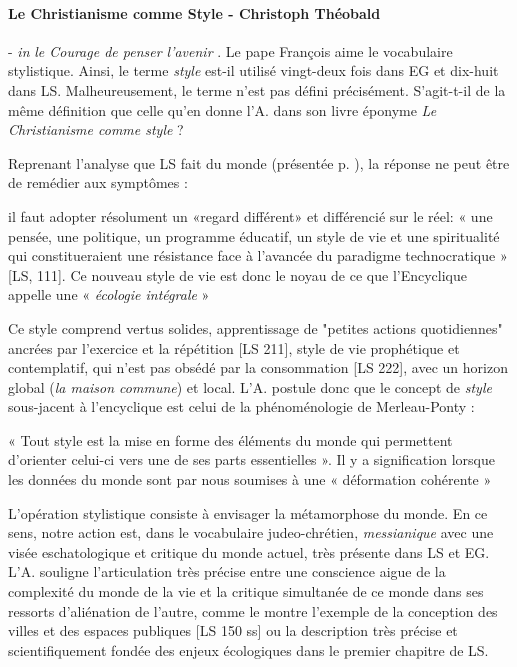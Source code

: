 \paragraph{Le Christianisme comme Style - Christoph Théobald} -  \textit{in }\textit{le Courage de penser l'avenir} \cite[p 169-196]{theobald_courage_2021}. Le pape François aime le vocabulaire stylistique. Ainsi, le terme \textit{style} est-il utilisé vingt-deux fois dans EG et dix-huit dans LS. Malheureusement, le terme n'est pas défini précisément. S'agit-t-il de la même définition que celle qu'en donne l'A. dans son livre éponyme \cite{theobald_christianisme_2007} \textit{Le Christianisme comme style}  ? 
\begin{comment}
    Nous nous proposons de lire ce chapitre soulignant la notion de \textit{recours} des religions et la distinction   entre \textit{ressources et sources} déjà entrevu dans \cite{theobald_lenseignement_2016}. 
    notion de \textit{recours}. Distinction entre \textit{ressources et sources}.  Style prophétique et contemplatif de \textit{Laudato Si’}. Nous n
\end{comment}
Reprenant l'analyse que LS fait du monde (présentée p. \pageref{theo:diagnosticLS}), la réponse ne peut être de remédier aux symptômes :
\begin{singlequote}
     il faut adopter résolument un «regard différent» et différencié sur le réel: « une pensée, une politique, un programme éducatif, un style de vie et une spiritualité qui constitueraient une résistance face à l'avancée du paradigme technocratique » [LS, 111]. Ce nouveau style de vie est donc le noyau de ce que l'Encyclique appelle une « \textit{écologie intégrale} »
\end{singlequote}

Ce style comprend vertus solides, apprentissage de "petites actions quotidiennes" ancrées par l'exercice et la répétition [LS 211], style de vie prophétique et contemplatif, qui n'est pas obsédé par la consommation [LS 222], avec un horizon global (\textit{la maison commune}) et local.
L'A. postule donc que le concept de \textit{style} sous-jacent à l'encyclique est celui de la phénoménologie de Merleau-Ponty :

\begin{singlequote}
« Tout style est la mise en forme des éléments du monde qui permettent d'orienter celui-ci vers une de ses parts essentielles ». Il y a signification lorsque les données du monde sont par nous soumises à une « déformation cohérente » \cite[p. 55, cité par l'A.]{merleau-ponty_signes_1960}

\end{singlequote}
L'opération stylistique consiste à envisager la métamorphose du monde. En ce sens, notre action est, dans le vocabulaire judeo-chrétien, \textit{messianique} avec une visée eschatologique et critique du monde actuel, très présente dans LS et EG. L'A. souligne l'articulation très précise entre une conscience aigue de la complexité du monde de la vie et la critique simultanée de ce monde dans ses ressorts d'aliénation de l'autre, comme le montre l'exemple de la conception des villes et des espaces publiques [LS 150 ss] ou la description très précise et scientifiquement fondée des enjeux écologiques dans le premier chapitre de LS.

